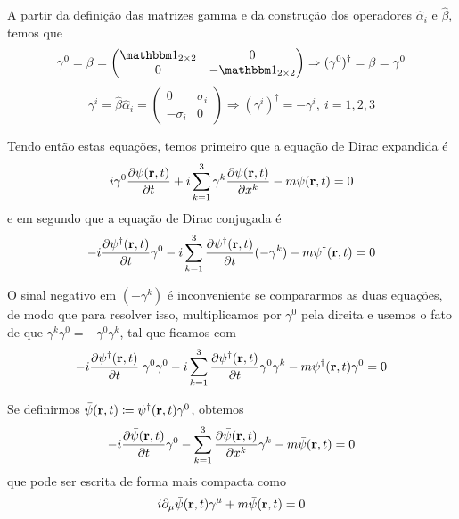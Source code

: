     A partir da definição das matrizes gamma e da construção dos operadores $\hat{\alpha}_{i}$ e $\hat{\beta}$, temos que
        \begin{equation}\label{eq: conjugated hermitian for gamma0}
            \gamma^{0} = \beta = \begin{pmatrix}
                \boldone_{2\times 2} & 0 \\
                0 & -\boldone_{2\times 2}
            \end{pmatrix} \Rightarrow (\gamma^{0})^{\dagger} = \beta = \gamma^{0}
        \end{equation}
        \begin{equation}
            \gamma^{i} = \hat{\beta}\hat{\alpha}_{i} = \begin{pmatrix}
                0 & \sigma_{i} \\
                -\sigma_{i} & 0
            \end{pmatrix} \Rightarrow (\gamma^{i})^{\dagger} = -\gamma^{i},\ i = 1,2,3
        \end{equation}

    Tendo então estas equações, temos primeiro que a equação de Dirac expandida é
        \begin{equation*}
            i\gamma^{0} \pdv{\psi(\vb{r},t)}{t} + i\sum_{k=1}^{3} \gamma^{k}\pdv{\psi(\vb{r},t)}{x^{k}} - m\psi(\vb{r},t) = 0
        \end{equation*}
    e em segundo que a equação de Dirac conjugada é
        \begin{equation*}
            -i\pdv{\psi^{\dagger}(\vb{r},t)}{t}\gamma^{0} - i\sum_{k=1}^{3} {\pdv{\psi^{\dagger}(\vb{r},t)}{t}} (-\gamma^{k}) - m\psi^{\dagger}(\vb{r},t) = 0
        \end{equation*}

    O sinal negativo em $(-\gamma^{k})$ é inconveniente se compararmos as duas equações, de modo que para resolver isso, multiplicamos por $\gamma^{0}$ pela direita e usemos o fato de que $\gamma^{k}\gamma^{0} = -\gamma^{0}\gamma^{k}$, tal que ficamos com
        \begin{equation*}
            -i\pdv{\psi^{\dagger}(\vb{r},t)}{t}\; \gamma^{0}\gamma^{0} - i\sum_{k=1}^{3} {\pdv{\psi^{\dagger}(\vb{r},t)}{t}}\gamma^{0}\gamma^{k} - m\psi^{\dagger}(\vb{r},t)\gamma^{0} = 0
        \end{equation*}

    Se definirmos $\bar{\psi}(\vb{r},t) \coloneqq \psi^{\dagger}(\vb{r},t)\gamma^{0}$, obtemos
        \begin{equation*}
            -i\pdv{\bar{\psi}(\vb{r},t)}{t}\gamma^{0} - \sum_{k=1}^{3}\pdv{\bar{\psi}(\vb{r},t)}{x^{k}}\gamma^{k} - m\bar{\psi}(\vb{r},t) = 0
        \end{equation*}
    que pode ser escrita de forma mais compacta como
        \begin{equation*}
            i\partial_{\mu}\bar{\psi}(\vb{r},t)\gamma^{\mu} + m \bar{\psi}(\vb{r},t) = 0
        \end{equation*}


